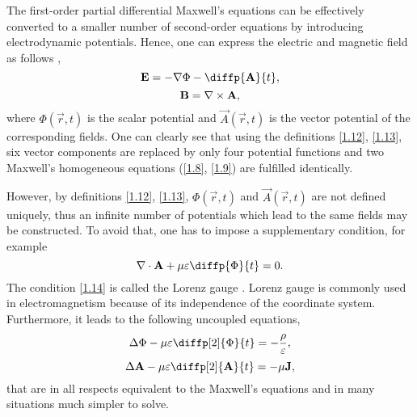 The first-order partial differential Maxwell's equations can be effectively converted to a smaller number of second-order equations by introducing electrodynamic potentials. Hence, one can express the electric and magnetic field as follows \cite{Thide2011},
\begin{equation}
\label{1.12}
\vec{E} = -\grad{\Phi} - \diffp{\vec{A}}{t},
\end{equation}
\begin{equation}
\label{1.13}
\mathbf{B} = \nabla \times \mathbf{A},
\end{equation}
where $ \Phi\left(\vec{r}, t \right) $ is the scalar potential and $ \vec{A}\left(\vec{r}, t \right) $ is the vector potential of the corresponding fields. One can clearly see that using the definitions \ref{1.12}, \ref{1.13}, six vector components are replaced by only four potential functions and two Maxwell's homogeneous equations (\ref{1.8}, \ref{1.9}) are fulfilled identically. 

However, by definitions \ref{1.12}, \ref{1.13}, $ \Phi\left(\vec{r}, t \right) $ and $ \vec{A}\left(\vec{r}, t \right) $ are not defined uniquely, thus an infinite number of potentials which lead to the same fields may be constructed. To avoid that, one has to impose a supplementary condition, for example
\begin{equation}
\label{1.14}
\div{\vec{A}} + \mu \varepsilon \diffp{\Phi}{t} = 0.
\end{equation}
The condition \ref{1.14} is called the Lorenz gauge \cite{Thide2011}. Lorenz gauge is commonly used in electromagnetism because of its independence of the coordinate system. Furthermore, it leads to the following uncoupled equations,
\begin{equation}
\label{1.15}
\laplace{\Phi} - \mu \varepsilon \diffp[2]{\Phi}{t} = -\frac{\rho}{\varepsilon},
\end{equation}
\begin{equation}
\label{1.16}
\laplace{\vec{A}} - \mu \varepsilon \diffp[2]{\vec{A}}{t} = -\mu \vec{J},
\end{equation}
that are in all respects equivalent to the Maxwell's equations and in many situations much simpler to solve.

